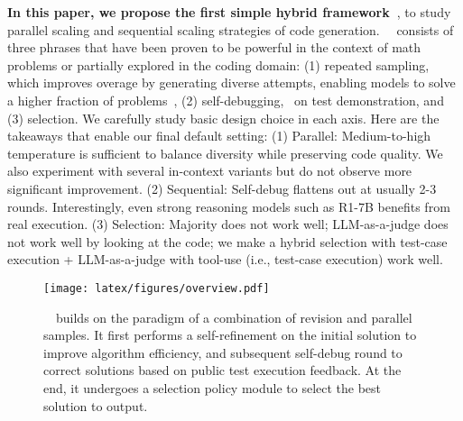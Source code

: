 \textbf{In this paper, we propose the first simple hybrid framework~\frameworkname}, to study parallel scaling and sequential scaling strategies of code generation. ~\frameworkname~consists of three phrases that have been proven to be powerful in the context of math problems or partially explored in the coding domain: (1) repeated sampling, which improves overage by generating diverse attempts, enabling models to solve a higher fraction of problems~\citep{brown2024large}, (2) self-debugging,~\citep{chen2023teaching, madaan2024self} on test demonstration, and (3) selection. 
We carefully study basic design choice in each axis. Here are the takeaways that enable our final default setting: (1) Parallel: Medium-to-high temperature is sufficient to balance diversity while preserving code quality. We also experiment with several in-context variants but do not observe more significant improvement. (2) Sequential: Self-debug flattens out at usually 2-3 rounds. Interestingly, even strong reasoning models such as R1-7B benefits from real execution. (3) Selection: Majority does not work well; LLM-as-a-judge does not work well by looking at the code; we make a hybrid selection with test-case execution + LLM-as-a-judge with tool-use (i.e., test-case execution) work well. 

\begin{figure}[th!]
    \centering
    \texttt{[image: latex/figures/overview.pdf]}
\caption{~\frameworkname~builds on the paradigm of a combination of revision and parallel samples.  It first performs a self-refinement on the initial solution to improve algorithm efficiency, and subsequent self-debug round to correct solutions based on public test execution feedback. At the end, it undergoes a selection policy module to select the best solution to output.
}
\label{fig:Design}
\end{figure}

